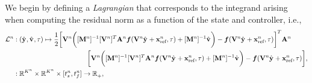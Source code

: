 We begin by defining a \textit{Lagrangian}  that corresponds to the integrand arising when
computing the residual norm as a function of the state and controller, i.e.,
\begin{equation}\label{eq:obj_controller}
\begin{split}
 \objectiveControlArg{n} &:  (\genstateyDiscreteArgnt{},\controllerDiscreteDumArgnt{},\timeDummy)
\mapsto \frac{1}{2} \bigg[ \basisspaceArg{n} \bigg(  [\massArg{n}]^{-1}\basisspaceTArg{n}
\stweightingMatArgt{n}{t}  \velocity(\basisspaceArg{n} \genstateyDiscreteArgnt{} +
\stateInterceptArg{n},\timeDummy) + [\massArg{n}]^{-1}\controllerDiscreteDumArgnt{} \bigg) -
\velocity(\basisspaceArg{n} \genstateyDiscreteArgnt{} + \stateInterceptArg{n},\timeDummy) \bigg]^T
\stweightingMatArgt{n}{t}  \\ & \hspace{1.5 in}\bigg[ \basisspaceArg{n} \bigg(
[\massArg{n}]^{-1}\basisspaceTArg{n} \stweightingMatArgt{n}{t}\velocity(\basisspaceArg{n}
\genstateyDiscreteArgnt{} + \stateInterceptArg{n},\timeDummy) + [\massArg{n}]^{-1}\controllerDiscreteDumArgnt{}
\bigg) - \velocity( \basisspaceArg{n}  \genstateyDiscreteArgnt{} + \stateInterceptArg{n},\timeDummy ) \bigg]
, \nonumber \\ & : \RR{\romdimArg{n}} \times \RR{\romdimArg{n}} \times
	[\timeStartArg{n},\timeEndArg{n}] \rightarrow \RRplus{},
\end{split}
\end{equation}
